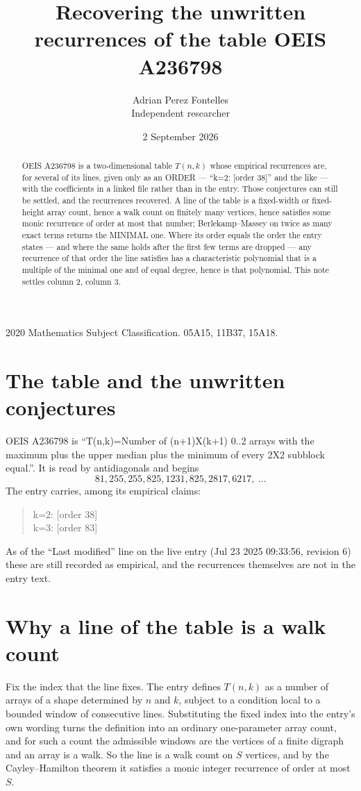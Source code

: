\documentclass[11pt,a4paper]{article}
\title{Recovering the unwritten recurrences of the table OEIS A236798}
\author{Adrian Perez Fontelles\\ \small Independent researcher}
\date{2 September 2026}
\theoremstyle{plain}
\theoremstyle{definition}
\begin{document}
\maketitle

\begin{abstract}
OEIS A236798 is a two-dimensional table $T(n,k)$ whose empirical recurrences are, for several of
its lines, given only as an ORDER --- ``k=2: [order 38]'' and the like --- with the
coefficients in a linked file rather than in the entry. Those conjectures can still be settled,
and the recurrences recovered. A line of the table is a fixed-width or fixed-height array
count, hence a walk count on finitely many vertices, hence satisfies some monic recurrence of
order at most that number; Berlekamp--Massey on twice as many exact terms returns the MINIMAL
one. Where its order equals the order the entry states --- and where the same holds after the
first few terms are dropped --- any recurrence of that order the line satisfies has a
characteristic polynomial that is a multiple of the minimal one and of equal degree, hence is
that polynomial. This note settles column 2, column 3.
\end{abstract}

\noindent\small 2020 Mathematics Subject Classification. 05A15, 11B37, 15A18.\normalsize

\section{The table and the unwritten conjectures}

OEIS A236798 is ``T(n,k)=Number of (n+1)X(k+1) 0..2 arrays with the maximum plus the upper median plus the minimum of every 2X2 subblock equal.''. It is read by antidiagonals and begins
\[
81, 255, 255, 825, 1231, 825, 2817, 6217,\ \dots
\]
The entry carries, among its empirical claims:
\begin{quote}\small
k=2: [order 38]\\
k=3: [order 83]
\end{quote}
As of the ``Last modified'' line on the live entry (Jul 23 2025 09:33:56, revision 6) these are still
recorded as empirical, and the recurrences themselves are not in the entry text.

\section{Why a line of the table is a walk count}

Fix the index that the line fixes. The entry defines $T(n,k)$ as a number of arrays of a shape
determined by $n$ and $k$, subject to a condition local to a bounded window of consecutive
lines. Substituting the fixed index into the entry's own wording turns the definition into an
ordinary one-parameter array count, and for such a count the admissible windows are the
vertices of a finite digraph and an array is a walk. So the line is a walk count on $S$
vertices, and by the Cayley--Hamilton theorem it satisfies a monic integer recurrence of order
at most $S$.
\end{document}
